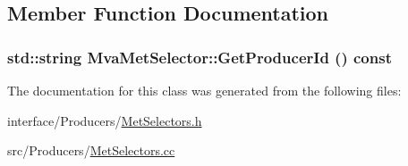 \subsection{Member Function Documentation}
\hypertarget{classMvaMetSelector_aa8e88529d9b7d537c6bd69c588e449f4}{
\subsubsection[{GetProducerId}]{\setlength{\rightskip}{0pt plus 5cm}std::string MvaMetSelector::GetProducerId () const}}
\label{classMvaMetSelector_aa8e88529d9b7d537c6bd69c588e449f4}


The documentation for this class was generated from the following files:\begin{DoxyCompactItemize}
\item 
interface/Producers/\hyperlink{MetSelectors_8h}{MetSelectors.h}\item 
src/Producers/\hyperlink{MetSelectors_8cc}{MetSelectors.cc}\end{DoxyCompactItemize}
